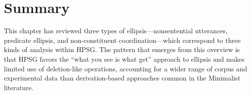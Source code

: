 %
 
%
%
%
%
%

%
%
%
%
%
%
%
%
%
%
%
%
%





\section{Summary}
\label{sum}

\largerpage
This chapter has reviewed three types of ellipsis---nonsentential utterances, predicate ellipsis, and non-constituent coordination---which correspond to three kinds of analysis within HPSG. The pattern that emerges from this overview is that HPSG favors the ``what you see is what get'' approach to ellipsis and makes limited use of deletion-like operations, %
 accounting for a wider range of corpus and experimental data %
 than derivation-based approaches common in the Minimalist literature.



